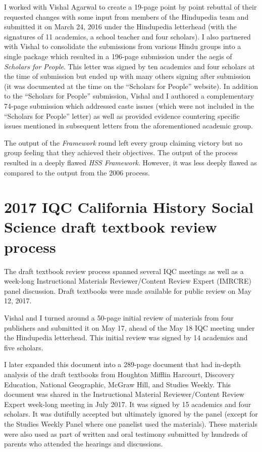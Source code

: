 I worked with Vishal Agarwal to create a 19-page point by point rebuttal of their requested changes with some input from members of the Hindupedia team and submitted it on March 24, 2016 under the Hindupedia letterhead (with the signatures of 11 academics, a school teacher and four scholars). I also partnered with Vishal to consolidate the submissions from various Hindu groups into a single package which resulted in a 196-page submission under the aegis of \textit{Scholars for People}. This letter was signed by ten academics and four scholars at the time of submission but ended up with many others signing after submission (it was documented at the time on the “Scholars for People” website). In addition to the “Scholars for People” submission, Vishal and I authored a complementary 74-page submission which addressed caste issues (which were not included in the “Scholars for People” letter) as well as provided evidence countering specific issues mentioned in subsequent letters from the aforementioned academic group.

The output of the \textit{Framework} round left every group claiming victory but no group feeling that they achieved their objectives. The output of the process resulted in a deeply flawed \textit{HSS Framework}. However, it was less deeply flawed as compared to the output from the 2006 process.

\section*{2017 IQC California History Social Science draft textbook review process}

The draft textbook review process spanned several IQC meetings as well as a week-long Instructional Materials Reviewer/Content Review Expert (IMRCRE) panel discussion. Draft textbooks were made available for public review on May 12, 2017. 

Vishal and I turned around a 50-page initial review of materials from four publishers and submitted it on May 17, ahead of the May 18 IQC meeting under the Hindupedia letterhead. This initial review was signed by 14 academics and five scholars. 

I later expanded this document into a 289-page document that had in-depth analysis of the draft textbooks from Houghton Mifflin Harcourt, Discovery Education, National Geographic, McGraw Hill, and Studies Weekly. This document was shared in the Instructional Material Reviewer/Content Review Expert week-long meeting in July 2017. It was signed by 15 academics and four scholars. It was dutifully accepted but ultimately ignored by the panel (except for the Studies Weekly Panel where one panelist used the materials). These materials were also used as part of written and oral testimony submitted by hundreds of parents who attended the hearings and discussions.

